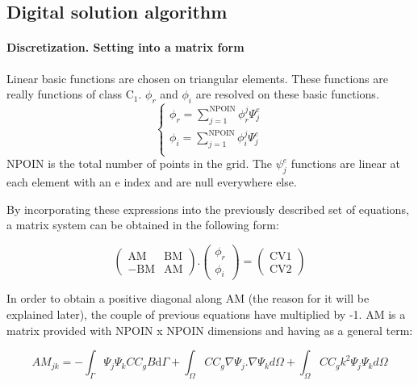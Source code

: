 \subsection{Digital solution algorithm}

\paragraph{Discretization. Setting into a matrix form}

Linear basic functions are chosen on triangular elements. These functions are
really  functions of class C${}_{1}$. $\phi_r$ and $\phi_i$ are resolved on
these basic functions.
\begin{equation}
\left\{
  \begin{matrix}
  \phi_r =\sum_{j=1}^{\text{NPOIN}} \phi_r^j\Psi_j^e \\
  \phi_i =\sum_{j=1}^{\text{NPOIN}} \phi_i^j\Psi_j^e \\
  \end{matrix}
  \right.%
  \label{eq:3.74}
\end{equation}
NPOIN is the total number of points in the grid. The $\psi_{j}^{e}$
functions are linear at each element with an e index and are null everywhere
else.

By incorporating these expressions into the previously described set of
equations, a matrix system can be obtained in the following form:

\begin{equation}
  \left(
  \begin{matrix}
    \text{AM} & \text{BM} \\
    -\text{BM} & \text{AM}
  \end{matrix}
  \right).
  \left(
    \begin{matrix}
     \phi_r \\
     \phi_i
    \end{matrix}
  \right) =
  \left(
  \begin{matrix}
    \text{CV1} \\
    \text{CV2}
  \end{matrix}
  \right)
  \label{eq:3.75}
\end{equation}

In order to obtain a positive diagonal along AM (the reason for it will be
explained later), the couple of previous equations have multiplied by -1. AM is
a matrix provided with NPOIN x NPOIN dimensions and having as a general term:

\begin{equation}
  AM_{jk} = -\int_\Gamma \Psi_j \Psi_k CC_g B \text{d}\Gamma +
             \int_\Omega CC_g \nabla\Psi_j.\nabla\Psi_k d\Omega +
             \int_\Omega CC_g k^2 \Psi_j \Psi_k d\Omega
  \label{eq:3.76}
\end{equation}

